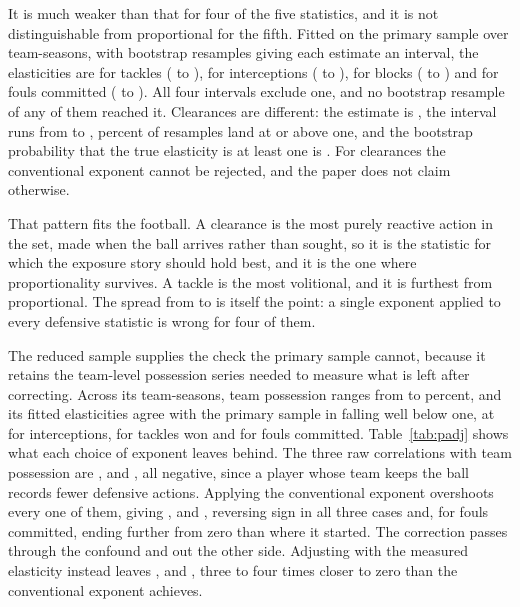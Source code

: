 It is much weaker than that for four of the five statistics, and it is not distinguishable from
proportional for the fifth. Fitted on the primary sample over \ArcPadjTeamSeasons{}
team-seasons, with \ElastNBootstrap{} bootstrap resamples giving each estimate an interval, the
elasticities are \ArcElastTackles{} for tackles (\ElastCITacklesLow{} to \ElastCITacklesHigh{}),
\ArcElastInterceptions{} for interceptions (\ElastCIInterceptionsLow{} to
\ElastCIInterceptionsHigh{}), \ArcElastBlocks{} for blocks (\ElastCIBlocksLow{} to
\ElastCIBlocksHigh{}) and \ArcElastFouls{} for fouls committed (\ElastCIFoulsLow{} to
\ElastCIFoulsHigh{}). All four intervals exclude one, and no bootstrap resample of any of them
reached it. Clearances are different: the estimate is \ArcElastClearances{}, the interval runs
from \ElastCIClearancesLow{} to \ElastCIClearancesHigh{}, \ElastShareOneClearances{} percent of
resamples land at or above one, and the bootstrap probability that the true elasticity is at
least one is \ElastPOneClearances{}. For clearances the conventional exponent cannot be
rejected, and the paper does not claim otherwise.

That pattern fits the football. A clearance is the most purely reactive action in the set, made
when the ball arrives rather than sought, so it is the statistic for which the exposure story
should hold best, and it is the one where proportionality survives. A tackle is the most
volitional, and it is furthest from proportional. The spread from \ArcElastMin{} to
\ArcElastMax{} is itself the point: a single exponent applied to every defensive statistic is
wrong for four of them.

The reduced sample supplies the check the primary sample cannot, because it retains the
team-level possession series needed to measure what is left after correcting. Across its
\PadjTeamSeasons{} team-seasons, team possession ranges from \PadjPossessionMin{} to
\PadjPossessionMax{} percent, and its fitted elasticities agree with the primary sample in
falling well below one, at \ElasticityInterceptions{} for interceptions,
\ElasticityTackles{} for tackles won and \ElasticityFouls{} for fouls committed.
Table~\ref{tab:padj} shows what each choice of exponent leaves behind. The three raw
correlations with team possession are \PadjCorrRawInterceptions{}, \PadjCorrRawTackles{} and
\PadjCorrRawFouls{}, all negative, since a player whose team keeps the ball records fewer
defensive actions. Applying the conventional exponent overshoots every one of them, giving
\PadjCorrUnitInterceptions{}, \PadjCorrUnitTackles{} and \PadjCorrUnitFouls{}, reversing sign
in all three cases and, for fouls committed, ending further from zero than where it started.
The correction passes through the confound and out the other side. Adjusting with the measured
elasticity instead leaves \PadjCorrAdjInterceptions{}, \PadjCorrAdjTackles{} and
\PadjCorrAdjFouls{}, three to four times closer to zero than the conventional exponent achieves.

